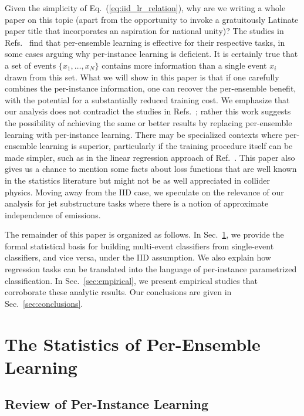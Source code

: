 \documentclass[aps,prx,reprint,preprintnumbers,superscriptaddress,nofootinbib,longbibliography,floatfix]{revtex4-2}
\DeclareRobustCommand{\Sec}[1]{Sec.~\ref{sec:#1}}
\DeclareRobustCommand{\Eq}[1]{Eq.~(\ref{eq:#1})}
\DeclareRobustCommand{\Ref}[1]{Ref.~\cite{#1}}
\DeclareRobustCommand{\Refs}[1]{Refs.~\cite{#1}}
\begin{document}
Given the simplicity of \Eq{iid_lr_relation}, why are we writing a whole paper on this topic (apart from the opportunity to invoke a gratuitously Latinate paper title that incorporates an aspiration for national unity)?
%
The studies in \Refs{Lai:2018ixk,Khosa:2019kxd,Du:2019civ,Mullin:2019mmh,Chang:2020rtc,Flesher:2020kuy,Lazzarin:2020uvv,Lai:2020byl} find that per-ensemble learning is effective for their respective tasks, in some cases arguing why per-instance learning is deficient.
%
It is certainly true that a set of events $\{x_1, \ldots, x_N\}$ contains more information than a single event $x_i$ drawn from this set.
%
What we will show in this paper is that if one carefully combines the per-instance information, one can recover the per-ensemble benefit, with the potential for a substantially reduced training cost.
%
We emphasize that our analysis does not contradict the studies in \Refs{Lai:2018ixk,Khosa:2019kxd,Du:2019civ,Mullin:2019mmh,Chang:2020rtc,Flesher:2020kuy,Lazzarin:2020uvv,Lai:2020byl}; rather this work suggests the possibility of achieving the same or better results by replacing per-ensemble learning with per-instance learning.
%
There may be specialized contexts where per-ensemble learning is superior, particularly if the training procedure itself can be made simpler, such as in the linear regression approach of \Ref{Flesher:2020kuy}.
%
This paper also gives us a chance to mention some facts about loss functions that are well known in the statistics literature but might not be as well appreciated in collider physics.
%
Moving away from the IID case, we speculate on the relevance of our analysis for jet substructure tasks where there is a notion of approximate independence of emissions.


The remainder of this paper is organized as follows.
%
In \Sec{statistics}, we provide the formal statistical basis for building multi-event classifiers from single-event classifiers, and vice versa, under the IID assumption.
%
We also explain how regression tasks can be translated into the language of per-instance parametrized classification.
%
In \Sec{empirical}, we present empirical studies that corroborate these analytic results. 
%
Our conclusions are given in \Sec{conclusions}.


\section{The Statistics of Per-Ensemble Learning}
\label{sec:statistics}

\subsection{Review of Per-Instance Learning}
\label{sec:per-instance}
\end{document}
